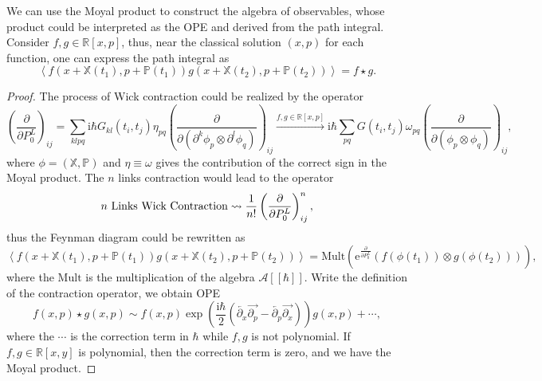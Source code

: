 \documentclass[10pt]{article}
\begin{document}
We can use the Moyal product to construct the algebra of observables, whose product could be interpreted as the OPE and derived from the path integral. Consider $ f, g \in \mathbb{R}[x,p]$, thus, near the classical solution $(x,p)$ for each function, one can express the path integral as
\begin{equation*}
  \left< f(x + \mathbb{X}(t_1), p + \mathbb{P}(t_1)) g(x+\mathbb{X}(t_2), p + \mathbb{P}(t_2)) \right> = f \star g.
\end{equation*}
\begin{proof}
  The process of Wick contraction could be realized by the operator
  \begin{equation*}
    \left( \frac{\partial }{\partial P_0^{L}}\right)_{ij} = \sum_{klpq} \mathrm{i} \hbar G_{kl}(t_i, t_{j}) \eta_{pq} \left( \frac{\partial }{\partial \left( \partial^{k} \phi_{p} \otimes \partial^{l} \phi_{q} \right)} \right)_{ij} \xrightarrow{f, g \in \mathbb{R}[x,p]} \mathrm{i} \hbar \sum_{pq} G(t_i, t_j) \omega_{pq} \left( \frac{\partial }{\partial \left( \phi_{p} \otimes \phi_{q} \right)} \right)_{ij},
  \end{equation*}
  where $ \phi = (\mathbb{X}, \mathbb{P})$ and $ \eta \equiv \omega$ gives the contribution of the correct sign in the Moyal product. The $ n$ links contraction would lead to the operator
  \begin{equation*}
    \text{$ n$ Links Wick Contraction} \leadsto \frac{1}{n!} \left( \frac{\partial }{\partial P^{L}_{0}} \right)^{n}_{ij},
  \end{equation*}
  thus the Feynman diagram could be rewritten as
  \begin{equation*}
    \left< f(x+\mathbb{X}(t_1), p + \mathbb{P}(t_1)) g(x + \mathbb{X}(t_2) , p + \mathbb{P}(t_2)) \right> = \mathrm{Mult} \left( \mathrm{e}^{\frac{\partial }{\partial P_{0}^{L}}} \left( f(\phi(t_1)) \otimes g(\phi(t_2))\right)\right),
  \end{equation*}
  where the $ \mathrm{Mult}$ is the multiplication of the algebra $ \mathcal{A}[[\hbar]]$. Write the definition of the contraction operator, we obtain OPE
  \begin{equation*}
    f(x,p) \star g(x,p) \sim f(x,p) \exp\left( \frac{\mathrm{i}\hbar}{2}\left( \overleftarrow{\partial_x} \overrightarrow{\partial_p} - \overleftarrow{\partial_p} \overrightarrow{\partial_x} \right) \right) g(x,p) + \cdots,
  \end{equation*}
  where the $ \cdots$ is the correction term in $ \hbar$ while $ f,g$ is not polynomial. If $ f, g \in \mathbb{R}[x,y]$ is polynomial, then the correction term is zero, and we have the Moyal product.
\end{proof}
\end{document}
